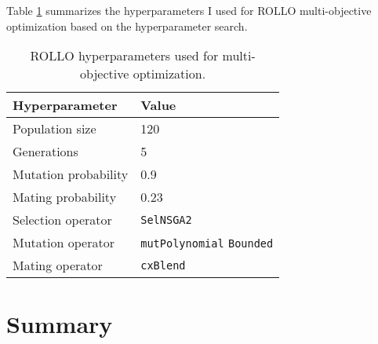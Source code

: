 Table \ref{tab:multi-obj-hyp} summarizes the hyperparameters I used for \gls{ROLLO} 
multi-objective optimization based on the hyperparameter search. 
\begin{table}[htbp]
    \centering
    \onehalfspacing
    \caption{\acrfull{ROLLO} hyperparameters used for multi-objective optimization.}
	\label{tab:multi-obj-hyp}
    \footnotesize
    \begin{tabular}{ll}
    \hline 
    \textbf{Hyperparameter} & \textbf{Value} \\
    \hline 
    Population size & 120 \\
    Generations & 5 \\
    Mutation probability & 0.9 \\
    Mating probability & 0.23 \\
    Selection operator & \texttt{SelNSGA2} \\
    Mutation operator & \texttt{mutPolynomial} \texttt{Bounded} \\
    Mating operator & \texttt{cxBlend} \\
    \hline
    \end{tabular}
\end{table}


\section{Summary}